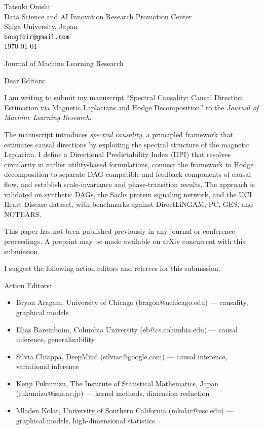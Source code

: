 



\begin{flushright}
Tatsuki Onishi\\
Data Science and AI Innovation Research Promotion Center\\
Shiga University, Japan\\
\texttt{bougtoir@gmail.com}\\[6pt]
\today
\end{flushright}

Journal of Machine Learning Research

\bigskip

Dear Editors:

I am writing to submit my manuscript ``Spectral Causality: Causal
Direction Estimation via Magnetic Laplacians and Hodge Decomposition''
to the \emph{Journal of Machine Learning Research}.

The manuscript introduces \emph{spectral causality}, a principled framework
that estimates causal directions by exploiting the spectral structure of the
magnetic Laplacian.  I define a Directional Predictability Index (DPI) that
resolves circularity in earlier utility-based formulations, connect the
framework to Hodge decomposition to separate DAG-compatible and feedback
components of causal flow, and establish scale-invariance and
phase-transition results.  The approach is validated on synthetic DAGs, the
Sachs protein signaling network, and the UCI Heart Disease dataset, with
benchmarks against DirectLiNGAM, PC, GES, and NOTEARS.

This paper has not been published previously in any journal or conference
proceedings.  A preprint may be made available on arXiv concurrent with this
submission.

I suggest the following action editors and referees for this submission.

Action Editors:
\begin{itemize}
  \item Bryon Aragam, University of Chicago (bragon@uchicago.edu) --- causality, graphical models
  \item Elias Bareinboim, Columbia University (eb@cs.columbia.edu) --- causal inference, generalizability
  \item Silvia Chiappa, DeepMind (silviac@google.com) --- causal inference, variational inference
  \item Kenji Fukumizu, The Institute of Statistical Mathematics, Japan (fukumizu@ism.ac.jp) --- kernel methods, dimension reduction
  \item Mladen Kolar, University of Southern California (mkolar@usc.edu) --- graphical models, high-dimensional statistics
\end{itemize}

